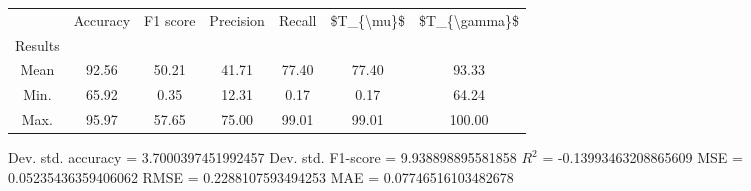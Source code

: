 \begin{tabular}{|c|c|c|c|c|c|c|}
\toprule
{} &  Accuracy &  F1 score &  Precision &  Recall &  \$T\_\{\textbackslash mu\}\$ &  \$T\_\{\textbackslash gamma\}\$ \\
Results &           &           &            &         &            &               \\
\hline
Mean    &     92.56 &     50.21 &      41.71 &   77.40 &      77.40 &         93.33 \\
Min.    &     65.92 &      0.35 &      12.31 &    0.17 &       0.17 &         64.24 \\
Max.    &     95.97 &     57.65 &      75.00 &   99.01 &      99.01 &        100.00 \\
\bottomrule
\end{tabular}

 Dev. std. accuracy = 3.7000397451992457
 Dev. std. F1-score = 9.938898895581858
 $R^2$ = -0.13993463208865609
 MSE = 0.05235436359406062
 RMSE = 0.2288107593494253
 MAE = 0.07746516103482678